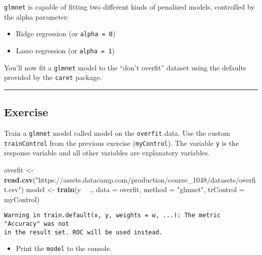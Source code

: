 \documentclass[]{book}
\newenvironment{Shaded}{\begin{snugshade}}{\end{snugshade}}
\newcommand{\KeywordTok}[1]{\textcolor[rgb]{0.13,0.29,0.53}{\textbf{#1}}}
\newcommand{\DataTypeTok}[1]{\textcolor[rgb]{0.13,0.29,0.53}{#1}}
\newcommand{\StringTok}[1]{\textcolor[rgb]{0.31,0.60,0.02}{#1}}
\newcommand{\OperatorTok}[1]{\textcolor[rgb]{0.81,0.36,0.00}{\textbf{#1}}}
\newcommand{\NormalTok}[1]{#1}
\providecommand{\tightlist}{%
  \setlength{\itemsep}{0pt}\setlength{\parskip}{0pt}}
\begin{document}
\texttt{glmnet} is capable of fitting two different kinds of penalized
models, controlled by the alpha parameter:

\begin{itemize}
\item
  Ridge regression (or \texttt{alpha\ =\ 0})
\item
  Lasso regression (or \texttt{alpha\ =\ 1})
\end{itemize}

You'll now fit a \texttt{glmnet} model to the ``don't overfit'' dataset
using the defaults provided by the \texttt{caret} package.

\begin{center}\rule{0.5\linewidth}{\linethickness}\end{center}

\subsection*{Exercise}\label{exercise-21}

Train a \texttt{glmnet} model called model on the \texttt{overfit} data.
Use the custom \texttt{trainControl} from the previous exercise
(\texttt{myControl}). The variable \texttt{y} is the response variable
and all other variables are explanatory variables.

\begin{Shaded}
\begin{Highlighting}[]
\NormalTok{overfit <-}\StringTok{ }\KeywordTok{read.csv}\NormalTok{(}\StringTok{"https://assets.datacamp.com/production/course_1048/datasets/overfit.csv"}\NormalTok{)}
\NormalTok{model <-}\StringTok{ }\KeywordTok{train}\NormalTok{(y }\OperatorTok{~}\StringTok{ }\NormalTok{., }
               \DataTypeTok{data =}\NormalTok{ overfit, }
               \DataTypeTok{method =} \StringTok{"glmnet"}\NormalTok{,}
               \DataTypeTok{trControl =}\NormalTok{ myControl)}
\end{Highlighting}
\end{Shaded}

\begin{verbatim}
Warning in train.default(x, y, weights = w, ...): The metric "Accuracy" was not
in the result set. ROC will be used instead.
\end{verbatim}

\begin{itemize}
\tightlist
\item
  Print the \texttt{model} to the console.
\end{itemize}
\end{document}
